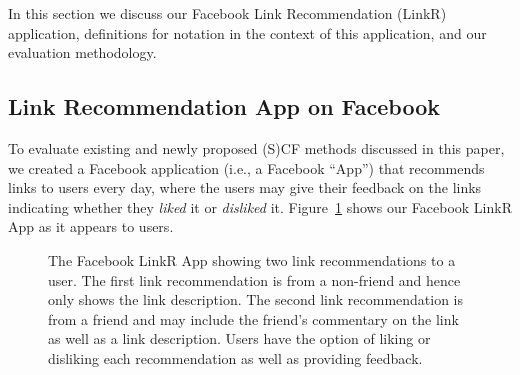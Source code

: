 In this section we discuss our Facebook Link Recommendation
(LinkR) application, definitions for 
notation in the context of this application, and our evaluation
methodology.

\subsection{Link Recommendation App on Facebook}

To evaluate existing and newly proposed (S)CF methods discussed in
this paper, we created a Facebook application (i.e., a Facebook
``App'') that recommends links to users every day, where the users may
give their feedback on the links indicating whether they \emph{liked}
it or \emph{disliked} it.  Figure~\ref{fig:linkr_app} shows 
our Facebook LinkR App as it appears to users.

\begin{figure}[t!]
\hspace{-2mm} 
\vspace{-8mm}
\caption{The Facebook LinkR App showing two link recommendations to a 
user.  The first link recommendation is from a non-friend and hence only
shows the link description.  
The second link recommendation is from a
friend and may include the friend's commentary on the link as well as a 
link description.  
Users have the option of liking or disliking each
recommendation as well as providing feedback.}
\label{fig:linkr_app}
\end{figure}

